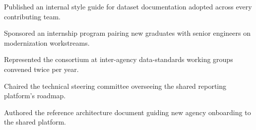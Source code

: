 \documentclass[fontsize=11pt, margin=narrow, medium=print]{careerdossier-resume}
\begin{document}
\begin{CDossierEntry}[title = {Modernization Program}, organization = {Continental Reliability Consortium}, location = {Ottawa, ON}, dates = {2019--Present}]
\begin{CDossierItemize}
    \item Published an internal style guide for dataset documentation adopted across every contributing team.
    \item Sponsored an internship program pairing new graduates with senior engineers on modernization workstreams.
    \item Represented the consortium at inter-agency data-standards working groups convened twice per year.
    \item Chaired the technical steering committee overseeing the shared reporting platform's roadmap.
    \item Authored the reference architecture document guiding new agency onboarding to the shared platform.
    \end{CDossierItemize}
\end{CDossierEntry}
\end{document}
